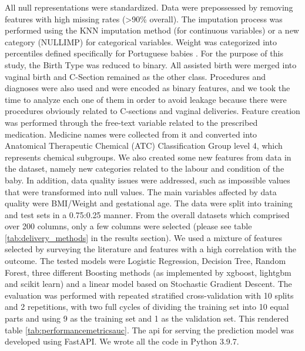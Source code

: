 All null representations were standardized. Data were prepossessed by removing features with high missing rates ({\textgreater}90\% overall). The imputation process was performed using the KNN imputation method (for continuous variables) or a new category (NULLIMP) for categorical variables. Weight was categorized into percentiles defined specifically for Portuguese babies \cite{sousa-santosDevelopmentBirthweightStandard2016}. For the purpose of this study, the Birth Type was reduced to binary. All assisted birth were merged into vaginal birth and C-Section remained as the other class. Procedures and diagnoses were also used and were encoded as binary features, and we took the time to analyze each one of them in order to avoid leakage because there were procedures obviously related to C-sections and vaginal deliveries. Feature creation was performed through the free-text variable related to the prescribed medication. Medicine names were collected from it and converted into Anatomical Therapeutic Chemical (ATC) Classification Group level 4, which represents chemical subgroups. We also created some new features from data in the dataset, namely new categories related to the labour and condition of the baby. In addition, data quality issues were addressed, such as impossible values that were transformed into null values. The main variables affected by data quality were BMI/Weight and gestational age. The data were split into training and test sets in a 0.75:0.25 manner. From the overall datasets which comprised over 200 columns, only a few columns were selected (please see table \ref{tab:delivery_methods} in the results section). We used a mixture of features selected by surveying the literature \cite{irwindaMaternalFetalCharacteristics2021,deramonfernandezPredictionModeDelivery2022,parveenAnalysisCesareanSections2021} and features with a high correlation with the outcome. The tested models were Logistic Regression, Decision Tree, Random Forest, three different Boosting methods (as implemented by \ac{xgboost}, \ac{lightgbm} and scikit learn) and a linear model based on Stochastic Gradient Descent. The evaluation was performed with repeated stratified cross-validation with 10 splits and 2 repetitions, with two full cycles of dividing the training set into 10 equal parts and using 9 as the training set and 1 as the validation set. This rendered table \ref{tab:performancemetricsauc}. The \ac{api} for serving the prediction model was developed using FastAPI. We wrote all the code in Python 3.9.7.



